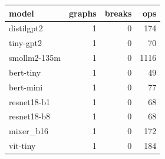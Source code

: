 \begin{tabular}{lrrr}
\toprule
model & graphs & breaks & ops \\
\midrule
distilgpt2 & 1 & 0 & 174 \\
tiny-gpt2 & 1 & 0 & 70 \\
smollm2-135m & 1 & 0 & 1116 \\
bert-tiny & 1 & 0 & 49 \\
bert-mini & 1 & 0 & 77 \\
resnet18-b1 & 1 & 0 & 68 \\
resnet18-b8 & 1 & 0 & 68 \\
mixer\_b16 & 1 & 0 & 172 \\
vit-tiny & 1 & 0 & 184 \\
\bottomrule
\end{tabular}
